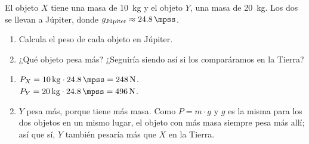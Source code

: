 \begin{exercise}
    El objeto \(X\) tiene una masa de \qty{10}{\kg} y el objeto \(Y\), una masa de \qty{20}{\kg}. Los dos se llevan a Júpiter, donde \(g_{\text{Júpiter}} \approx \qty{24.8}{\mpss}\).
    \begin{enumerate}[label=\letraminuscula]
        \item Calcula el peso de cada objeto en Júpiter.
        \item ¿Qué objeto pesa más? ¿Seguiría siendo así si los comparáramos en la Tierra?
    \end{enumerate}
    \begin{solu}
        \begin{enumerate}[label=\alph*)]
            \item \(P_X = \qty{10}{\kg} \cdot \qty{24.8}{\mpss} = \qty{248}{\newton}\). \\
            \(P_Y = \qty{20}{\kg} \cdot \qty{24.8}{\mpss} = \qty{496}{\newton}\).
            \item \(Y\) pesa más, porque tiene más masa. Como \(P = m \cdot g\) y \(g\) es la misma para los dos objetos en un mismo lugar, el objeto con más masa siempre pesa más allí; así que sí, \(Y\) también pesaría más que \(X\) en la Tierra.
        \end{enumerate}
    \end{solu}
\end{exercise}

